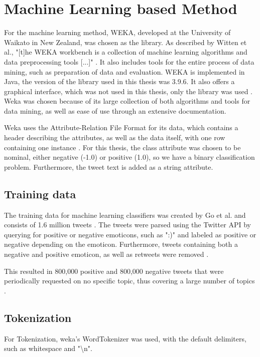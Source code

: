 \section{Machine Learning based Method}

For the machine learning method, WEKA, developed at the University of Waikato in New Zealand, was chosen as the library. As described by Witten et al., "[t]he WEKA workbench is a collection of machine learning algorithms and data preprocessing tools [...]" \cite[p.~7]{weka}. It also includes tools for the entire process of data mining, such as preparation of data and evaluation. WEKA is implemented in Java, the version of the library used in this thesis was 3.9.6. It also offers a graphical interface, which was not used in this thesis, only the library was used \cite{weka}. Weka was chosen because of its large collection of both algorithms and tools for data mining, as well as ease of use through an extensive documentation.

Weka uses the Attribute-Relation File Format for its data, which contains a header describing the attributes, as well as the data itself, with one row containing one instance \cite{weka}. For this thesis, the class attribute was chosen to be nominal, either negative (-1.0) or positive (1.0), so we have a binary classification problem. Furthermore, the tweet text is added as a string attribute.

\subsection{Training data}
The training data for machine learning classifiers was created by Go et al. and consists of 1.6 million tweets \cite{GoBHaHua2009}. The tweets were parsed using the Twitter API by querying for positive or negative emoticons, such as ":)" and labeled as positive or negative depending on the emoticon. Furthermore, tweets containing both a negative and positive emoticon, as well as retweets were removed \cite{GoBHaHua2009}.

This resulted in 800,000 positive and 800,000 negative tweets that were periodically requested on no specific topic, thus covering a large number of topics \cite{GoBHaHua2009}.


\subsection{Tokenization}
For Tokenization, weka's WordTokenizer was used, with the default delimiters, such as whitespace and "\textbackslash n".
